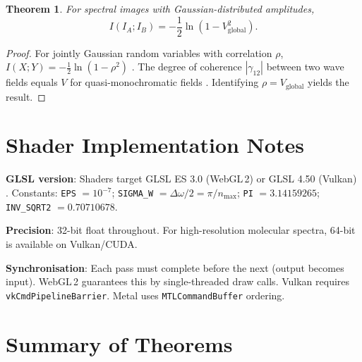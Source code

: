 \documentclass[11pt,twocolumn,a4paper]{article}
\newtheorem{theorem}{Theorem}[section]
\begin{document}
\begin{theorem}
For spectral images with Gaussian-distributed amplitudes,
\begin{equation}
\label{eq:vis_mi}
  I(I_A; I_B) = -\frac{1}{2}\ln(1 - V_{\text{global}}^2).
\end{equation}
\end{theorem}

\begin{proof}
For jointly Gaussian random variables with correlation $\rho$,
$I(X;Y) = -\frac{1}{2}\ln(1 - \rho^2)$ \citep{cover2006}. The degree
of coherence $|\gamma_{12}|$ between two wave fields equals $V$ for
quasi-monochromatic fields \citep{born1999, vanzernike1938}. Identifying
$\rho = V_{\text{global}}$ yields the result.
\end{proof}


\section{Shader Implementation Notes}
\label{app:shader}

\textbf{GLSL version}: Shaders target GLSL ES 3.0 (WebGL\,2) or
GLSL 4.50 (Vulkan) \citep{glslspec}. Constants: \texttt{EPS} $= 10^{-7}$;
\texttt{SIGMA\_W} $= \Delta\omega / 2 = \pi / n_{\max}$;
\texttt{PI} $= 3.14159265$; \texttt{INV\_SQRT2} $= 0.70710678$.

\textbf{Precision}: 32-bit float throughout. For high-resolution
molecular spectra, 64-bit is available on Vulkan/CUDA.

\textbf{Synchronisation}: Each pass must complete before the next
(output becomes input). WebGL\,2 guarantees this by single-threaded draw
calls. Vulkan requires \texttt{vkCmdPipelineBarrier}. Metal uses
\texttt{MTLCommandBuffer} ordering.


\section{Summary of Theorems}
\label{app:theorem_summary}
\end{document}
